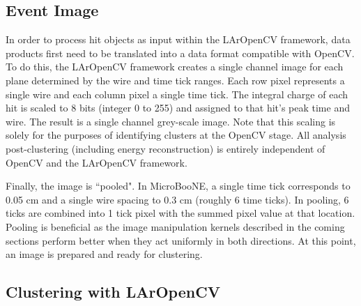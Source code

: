 \subsection{Event Image}
\par In order to process hit objects as input within the LArOpenCV framework, data products first need to be translated into a data format compatible with OpenCV. To do this, the LArOpenCV framework creates a single channel image for each plane determined by the wire and time tick ranges. Each row pixel represents a single wire and each column pixel a single time tick. The integral charge of each hit is scaled to 8 bits (integer 0 to 255) and assigned to that hit's peak time and wire. The result is a single channel grey-scale image. Note that this scaling is solely for the purposes of identifying clusters at the OpenCV stage. All analysis post-clustering (including energy reconstruction) is entirely independent of OpenCV and the LArOpenCV framework. 
\par Finally, the image is ``pooled". In MicroBooNE, a single time tick corresponds to 0.05 cm and a single wire spacing to 0.3 cm (roughly 6 time ticks).  In pooling, 6 ticks are combined into 1 tick pixel with the summed pixel value at that location.  Pooling is beneficial as the image manipulation kernels described in the coming sections perform better when they act uniformly in both directions. At this point, an image is prepared and ready for clustering.

\subsection{Clustering with LArOpenCV }

